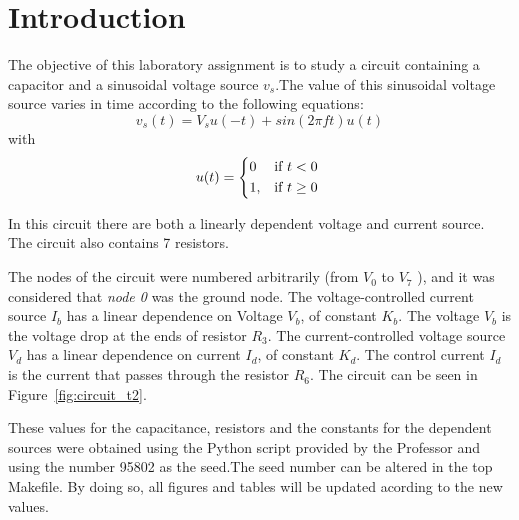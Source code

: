 \section{Introduction}
\label{sec:introduction}

\par The objective of this laboratory assignment is to study a circuit containing a capacitor and a sinusoidal voltage source $v_s$.The value of this sinusoidal voltage source varies in time according to the following equations: 
\begin {equation}
	v_s( t)  = V_s u(-t) + sin( 2 \pi f t ) u( t)
	\label{eq:i1}
\end{equation}
 with 
\begin {equation}
	u( t ) =  
	\begin{cases*} 
	  0 & if $t < 0$ \\
	1, & if $t \geq 0$
	\end{cases*}
	\label{eq:i2}
\end{equation}

In this circuit there are both a linearly dependent voltage and current source. The circuit also contains 7 resistors.\par
The nodes of the circuit were numbered arbitrarily (from {\it$V_{0}$}  to {\it$V_{7}$} ), and it was considered that {\it node 0} was the ground node. The voltage-controlled current source {\it $I_b$} has a linear dependence on Voltage {\it $V_b$}, of constant {\it $K_b$}. The voltage {\it $V_b$} is the voltage drop at the ends of resistor {\it $R_3$}. The current-controlled voltage source {\it $V_d$} has a linear dependence on current {\it $I_d$}, of constant {\it $K_d$}. The control current {\it $I_d$} is the current that passes through the resistor {\it $R_6$}.
The circuit can be seen in {Figure~\ref{fig:circuit_t2}}.\par
These values for the capacitance, resistors and the constants for the dependent sources were obtained using the Python script provided by the Professor and using the number 95802 as the seed.The seed number can be altered in the top Makefile. By doing so, all figures and tables will be updated acording to the new values. \par

